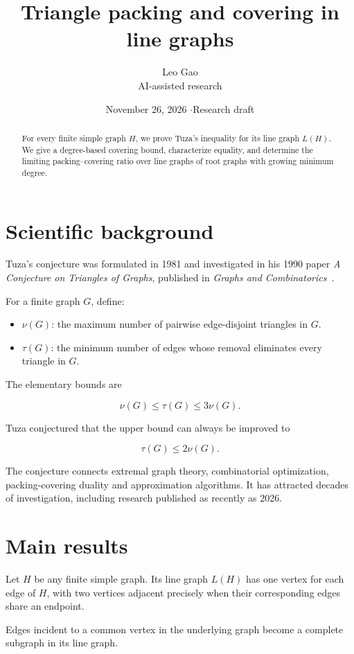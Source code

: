 \documentclass[11pt]{article}
\title{Triangle packing and covering in line graphs}
\author{Leo Gao\\[-1pt]{\small AI-assisted research}}
\date{November 26, 2026 \quad$\cdot$\quad Research draft}
\begin{document}
\maketitle
\begin{abstract}
For every finite simple graph $H$, we prove Tuza's inequality for its line graph $L(H)$. We give a degree-based covering bound, characterize equality, and determine the limiting packing--covering ratio over line graphs of root graphs with growing minimum degree.
\end{abstract}
\section{Scientific background}

Tuza's conjecture was formulated in 1981 and investigated in his 1990 paper \emph{A Conjecture on Triangles of Graphs}, published in \emph{Graphs and Combinatorics}~\cite{Tuza}.

For a finite graph \(G\), define:

\begin{itemize}
\item \(\nu(G)\): the maximum number of pairwise edge-disjoint triangles in \(G\).
\item \(\tau(G)\): the minimum number of edges whose removal eliminates every triangle in \(G\).

\end{itemize}
The elementary bounds are

\[
\nu(G)\leq\tau(G)\leq3\nu(G).
\]

Tuza conjectured that the upper bound can always be improved to

\[
\boxed{\tau(G)\leq2\nu(G).}
\]

The conjecture connects extremal graph theory, combinatorial optimization, packing-covering duality and approximation algorithms. It has attracted decades of investigation, including research published as recently as 2026.

\section{Main results}

Let \(H\) be any finite simple graph. Its line graph \(L(H)\) has one vertex for each edge of \(H\), with two vertices adjacent precisely when their corresponding edges share an endpoint.

Edges incident to a common vertex in the underlying graph become a complete subgraph in its line graph.
\end{document}
